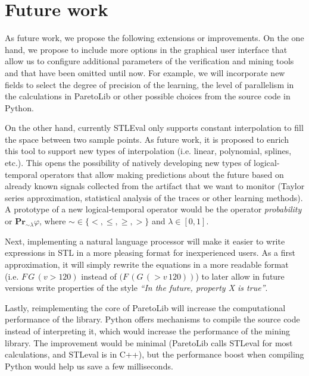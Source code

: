 \section{Future work}
As future work, we propose the following extensions or improvements. On the one hand, we propose to include more options in the graphical user interface that allow us to configure additional parameters of the verification and mining tools and that have been omitted until now. For example, we will incorporate new fields to select the degree of precision of the learning, the level of parallelism in the calculations in ParetoLib or other possible choices from the source code in Python.


On the other hand, currently STLEval only supports constant interpolation to fill the space between two sample points. As future work, it is proposed to enrich this tool to support new types of interpolation (i.e. linear, polynomial, splines, etc.). This opens the possibility of natively developing new types of logical-temporal operators that allow making predictions about the future based on already known signals collected from the artifact that we want to monitor (Taylor series approximation, statistical analysis of the traces or other learning methods). A prototype of a new logical-temporal operator would be the operator \textit{probability} or $\mathbf{Pr}_{\sim \lambda}\varphi$, where $\sim \in \{<, \leq, \geq, >\}$ and $\lambda \in [0, 1]$.

Next, implementing a natural language processor will make it easier to write expressions in STL in a more pleasing format for inexperienced users. As a first approximation, it will simply rewrite the equations in a more readable format (i.e. $F\, G\, (v > 120)$ instead of $(F \, (G \, ( > v \, 120))$) to later allow in future versions write properties of the style \textit{``In the future, property X is true''}.

Lastly, reimplementing the core of ParetoLib will increase the computational performance of the library. Python offers mechanisms to compile the source code instead of interpreting it, which would increase the performance of the mining library. The improvement would be minimal (ParetoLib calls STLeval for most calculations, and STLeval is in C++), but the performance boost when compiling Python would help us save a few milliseconds.
